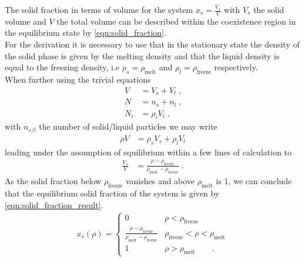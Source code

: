 The solid fraction in terms of volume for the system $x_s = \frac{V_s}{V}$ with $V_s$ the solid volume and $V$ the total volume can be described within the coexistence region in the equilibrium state by \autoref{eqn:solid_fraction}.\\ 
For the derivation it is necessary to use that in the stationary state the density of the solid phase is given by the melting density and that the liquid density is equal to the freezing density, i.e $\rho_s = \rho_{\text{melt}}$ and $\rho_l = \rho_{\text{freeze}}$ respectively.\\
When further using the trivial equations
\begin{align}
V &= V_s + V_l \; \text{,} \nonumber\\
N &= n_s + n_l \; \text{,} \nonumber\\
N_i &= \rho_i V_i \; \text{,} 
\end{align}
with $n_{s/l}$ the number of solid/liquid particles we may write
\begin{align}
\rho V &= \rho_s V_s + \rho_l V_l
\end{align}
leading under the assumption of equilibrium within a few lines of calculation to 
\begin{align}
\frac{V_s}{V} &= \frac{\rho - \rho_{\text{freeze}}}{\rho_{\text{melt}} - \rho_{\text{freeze}} } \; \text{.}
\end{align}
As the solid fraction below $\rho_{\text{freeze}} $ vanishes and above $\rho_{\text{melt}}$ is 1, we can conclude that the equilibrium solid fraction of the system is given by \autoref{eqn:solid_fraction_result}.
\begin{align}
\label{eqn:solid_fraction_result}
x_s(\rho) = 
\begin{cases}
0 & \rho <  \rho_{\text{freeze}}\\
\frac{\rho-\rho_{\text{freeze}}}{\rho_{\text{melt}}-\rho_{\text{freeze}}} &  \rho_{\text{freeze}} < \rho <  \rho_{\text{melt}}\\ 
1 &  \rho > \rho_{\text{melt}} \quad \quad \text{.}
\end{cases}
\end{align}

